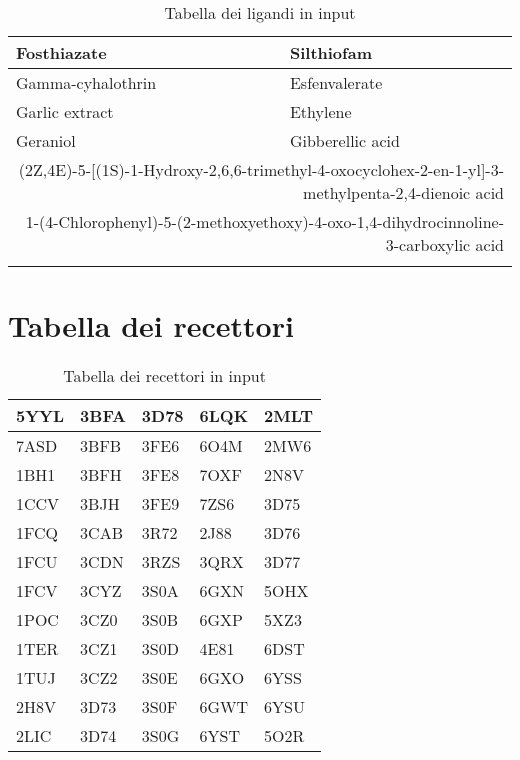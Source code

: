 \begin{small}
\begin{longtable}{|l|l|}
        Fosthiazate & Silthiofam \\ \hline
        Gamma-cyhalothrin & Esfenvalerate \\ \hline
        Garlic extract & Ethylene \\ \hline
        Geraniol & Gibberellic acid \\ \hline
        \multicolumn{2}{|r|}{{(2Z,4E)-5-[(1S)-1-Hydroxy-2,6,6-trimethyl-4-oxocyclohex-2-en-1-yl]-3-methylpenta-2,4-dienoic acid}}\\ \hline
        \multicolumn{2}{|r|}{{1-(4-Chlorophenyl)-5-(2-methoxyethoxy)-4-oxo-1,4-dihydrocinnoline-3-carboxylic acid}}\\ \hline
        \caption{Tabella dei ligandi in input} \label{tab:Tabella dei Ligandi}\\
    \end{longtable}
\end{small}

\chapter{Tabella dei recettori}
\begin{table}[!ht]
    \centering
    \begin{tabular}{|l|l|l|l|l|}
        \hline
        5YYL & 3BFA & 3D78 & 6LQK & 2MLT \\ \hline
        7ASD & 3BFB & 3FE6 & 6O4M & 2MW6 \\ \hline
        1BH1 & 3BFH & 3FE8 & 7OXF & 2N8V \\ \hline
        1CCV & 3BJH & 3FE9 & 7ZS6 & 3D75 \\ \hline
        1FCQ & 3CAB & 3R72 & 2J88 & 3D76 \\ \hline
        1FCU & 3CDN & 3RZS & 3QRX & 3D77 \\ \hline
        1FCV & 3CYZ & 3S0A & 6GXN & 5OHX \\ \hline
        1POC & 3CZ0 & 3S0B & 6GXP & 5XZ3 \\ \hline
        1TER & 3CZ1 & 3S0D & 4E81 & 6DST \\ \hline
        1TUJ & 3CZ2 & 3S0E & 6GXO & 6YSS \\ \hline
        2H8V & 3D73 & 3S0F & 6GWT & 6YSU \\ \hline
        2LIC & 3D74 & 3S0G & 6YST & 5O2R \\ \hline
    \end{tabular}
    \caption{Tabella dei recettori in input} 
    \label{Tabella dei Recettori}
\end{table}